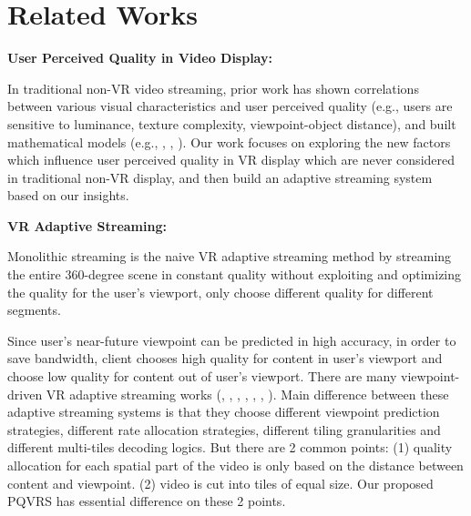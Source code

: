 \section{Related Works}

\textbf{User Perceived Quality in Video Display:}

In traditional non-VR video streaming, prior work has shown correlations between various visual characteristics and user perceived quality (e.g., users are sensitive to luminance, texture complexity, viewpoint-object distance), and built mathematical models (e.g., \cite{distance}, \cite{PSPNR}, \cite{brain}). Our work focuses on exploring the new factors which influence user perceived quality in VR display which are never considered in traditional non-VR display, and then build an adaptive streaming system based on our insights.

\textbf{VR Adaptive Streaming:}

Monolithic streaming is the naive VR adaptive streaming method by streaming the entire 360-degree scene in constant quality without exploiting and optimizing the quality for the user's viewport, only choose different quality for different segments.

Since user's near-future viewpoint can be predicted in high accuracy,  in order to save bandwidth, client chooses high quality for content in user's viewport and choose low quality for content out of user's viewport. There are many viewpoint-driven VR adaptive streaming works (\cite{viewpoint-driven1}, \cite{viewpoint-driven2}, \cite{viewpoint-driven3}, \cite{viewpoint-driven4}, \cite{viewpoint-driven5}, \cite{viewpoint-driven6}, \cite{Flare}). Main difference between these adaptive streaming systems is that they choose different viewpoint prediction strategies, different rate allocation strategies, different tiling granularities and different multi-tiles decoding logics. But there are 2 common points: (1) quality allocation for each spatial part of the video is only based on the distance between content and viewpoint. (2) video is cut into tiles of equal size. Our proposed PQVRS has essential difference on these 2 points.